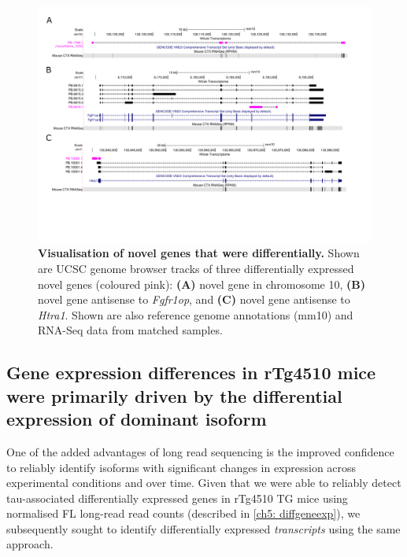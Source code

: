 \begin{landscape}
	\begin{figure}[!htp]
		\centering
		\includegraphics[page=1,trim={0 3.5cm 0 1cm}, scale = 0.80]{Figures/TracksFigures_Diff.pdf}
		\captionsetup{width=1.4\textwidth}
		\caption[Visualisation of differentially expressed novel genes]%
		{\textbf{Visualisation of novel genes that were differentially.} Shown are UCSC genome browser tracks of three differentially expressed novel genes (coloured pink): \textbf{(A)} novel gene in chromosome 10, \textbf{(B)} novel gene antisense to \textit{Fgfr1op}, and \textbf{(C)} novel gene antisense to \textit{Htra1}. Shown are also reference genome annotations (mm10) and RNA-Seq data from matched samples.}   
		\label{fig:whole_novelgene_difftracks}
	\end{figure}
\end{landscape}

\clearpage
\subsection{Gene expression differences in rTg4510 mice were primarily driven by the differential expression of dominant isoform}
One of the added advantages of long read sequencing is the improved confidence to reliably identify isoforms with significant changes in expression across experimental conditions and over time. Given that we were able to reliably detect tau-associated differentially expressed genes in rTg4510 TG mice using normalised FL long-read read counts (described in \cref{ch5: diffgeneexp}), we subsequently sought to identify differentially expressed \textit{transcripts} using the same approach. 

